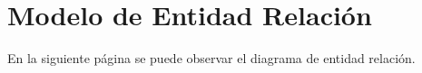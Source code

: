 \section{Modelo de Entidad Relación}

En la siguiente página se puede observar el diagrama de entidad relación.



